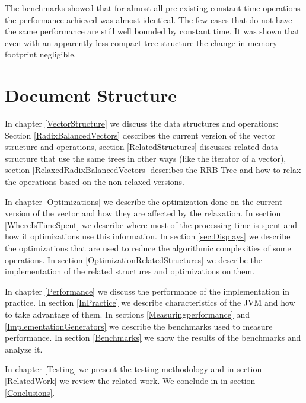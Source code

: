 The benchmarks showed that for almost all pre-existing constant time operations the performance achieved was almost identical. The few cases that do not have the same performance are still well bounded by constant time. It was shown that even with an apparently less compact tree structure the change in memory footprint negligible.

\section{Document Structure}
In chapter \ref{VectorStructure} we discuss the data structures and operations: Section \ref{RadixBalancedVectors} describes the current version of the vector structure and operations, section \ref{RelatedStructures} discusses related data structure that use the same trees in other ways (like the iterator of a vector), section \ref{RelaxedRadixBalancedVectors} describes the RRB-Tree and how to relax the operations based on the non relaxed versions.

In chapter \ref{Optimizations} we describe the optimization done on the current version of the vector and how they are affected by the relaxation. In section \ref{WhereIsTimeSpent} we describe where most of the processing time is spent and how it optimizations use this information. In section \ref{sec:Displays} we describe the optimizations that are used to reduce the algorithmic complexities of some operations. In section \ref{OptimizationRelatedStructures} we describe the implementation of the related structures and optimizations on them.

In chapter \ref{Performance} we discuss the performance of the implementation in practice. In section \ref{InPractice} we describe characteristics of the JVM and how to take advantage of them. In sections \ref{Measuringperformance} and \ref{ImplementationGenerators} we describe the benchmarks used to measure performance. In section \ref{Benchmarks} we show  the results of the benchmarks and analyze it.


In chapter \ref{Testing} we present the testing methodology and in section \ref{RelatedWork} we review the related work. We conclude in in section \ref{Conclusions}.




